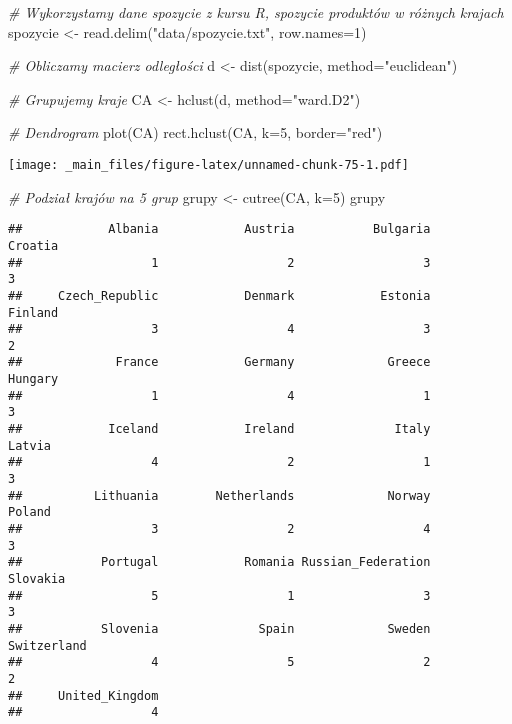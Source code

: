 \documentclass[
]{book}
\newenvironment{Shaded}{\begin{snugshade}}{\end{snugshade}}
\newcommand{\AttributeTok}[1]{\textcolor[rgb]{0.77,0.63,0.00}{#1}}
\newcommand{\CommentTok}[1]{\textcolor[rgb]{0.56,0.35,0.01}{\textit{#1}}}
\newcommand{\DecValTok}[1]{\textcolor[rgb]{0.00,0.00,0.81}{#1}}
\newcommand{\FunctionTok}[1]{\textcolor[rgb]{0.00,0.00,0.00}{#1}}
\newcommand{\NormalTok}[1]{#1}
\newcommand{\OtherTok}[1]{\textcolor[rgb]{0.56,0.35,0.01}{#1}}
\newcommand{\StringTok}[1]{\textcolor[rgb]{0.31,0.60,0.02}{#1}}
\begin{document}
\begin{Shaded}
\begin{Highlighting}[]
\CommentTok{\# Wykorzystamy dane spozycie z kursu R, spozycie produktów w różnych krajach }
\NormalTok{spozycie }\OtherTok{\textless{}{-}} \FunctionTok{read.delim}\NormalTok{(}\StringTok{"data/spozycie.txt"}\NormalTok{, }\AttributeTok{row.names=}\DecValTok{1}\NormalTok{)}

\CommentTok{\# Obliczamy macierz odległości}
\NormalTok{d }\OtherTok{\textless{}{-}} \FunctionTok{dist}\NormalTok{(spozycie, }\AttributeTok{method=}\StringTok{"euclidean"}\NormalTok{)}

\CommentTok{\# Grupujemy kraje}
\NormalTok{CA }\OtherTok{\textless{}{-}} \FunctionTok{hclust}\NormalTok{(d, }\AttributeTok{method=}\StringTok{"ward.D2"}\NormalTok{) }

\CommentTok{\# Dendrogram}
\FunctionTok{plot}\NormalTok{(CA)}
\FunctionTok{rect.hclust}\NormalTok{(CA, }\AttributeTok{k=}\DecValTok{5}\NormalTok{, }\AttributeTok{border=}\StringTok{"red"}\NormalTok{) }
\end{Highlighting}
\end{Shaded}

\texttt{[image: \_main\_files/figure-latex/unnamed-chunk-75-1.pdf]}

\begin{Shaded}
\begin{Highlighting}[]
\CommentTok{\# Podział krajów na 5 grup}
\NormalTok{grupy }\OtherTok{\textless{}{-}} \FunctionTok{cutree}\NormalTok{(CA, }\AttributeTok{k=}\DecValTok{5}\NormalTok{)}
\NormalTok{grupy}
\end{Highlighting}
\end{Shaded}

\begin{verbatim}
##            Albania            Austria           Bulgaria            Croatia 
##                  1                  2                  3                  3 
##     Czech_Republic            Denmark            Estonia            Finland 
##                  3                  4                  3                  2 
##             France            Germany             Greece            Hungary 
##                  1                  4                  1                  3 
##            Iceland            Ireland              Italy             Latvia 
##                  4                  2                  1                  3 
##          Lithuania        Netherlands             Norway             Poland 
##                  3                  2                  4                  3 
##           Portugal            Romania Russian_Federation           Slovakia 
##                  5                  1                  3                  3 
##           Slovenia              Spain             Sweden        Switzerland 
##                  4                  5                  2                  2 
##     United_Kingdom 
##                  4
\end{verbatim}
\end{document}
